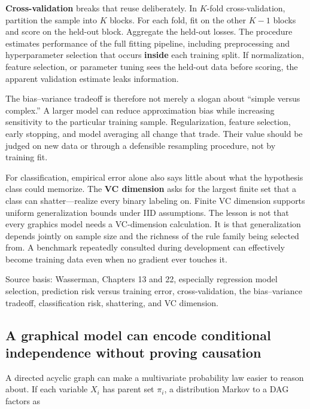 \textbf{Cross-validation} breaks that reuse deliberately. In \(K\)-fold cross-validation, partition the sample into \(K\) blocks. For each fold, fit on the other \(K-1\) blocks and score on the held-out block. Aggregate the held-out losses. The procedure estimates performance of the full fitting pipeline, including preprocessing and hyperparameter selection that occurs \textbf{inside} each training split. If normalization, feature selection, or parameter tuning sees the held-out data before scoring, the apparent validation estimate leaks information.

The bias--variance tradeoff is therefore not merely a slogan about ``simple versus complex.'' A larger model can reduce approximation bias while increasing sensitivity to the particular training sample. Regularization, feature selection, early stopping, and model averaging all change that trade. Their value should be judged on new data or through a defensible resampling procedure, not by training fit.

For classification, empirical error alone also says little about what the hypothesis class could memorize. The \textbf{VC dimension} asks for the largest finite set that a class can shatter---realize every binary labeling on. Finite VC dimension supports uniform generalization bounds under IID assumptions. The lesson is not that every graphics model needs a VC-dimension calculation. It is that generalization depends jointly on sample size and the richness of the rule family being selected from. A benchmark repeatedly consulted during development can effectively become training data even when no gradient ever touches it.

Source basis: Wasserman, Chapters 13 and 22, especially regression model selection, prediction risk versus training error, cross-validation, the bias--variance tradeoff, classification risk, shattering, and VC dimension.

\subsection{A graphical model can encode conditional independence without proving causation}\label{02-foundations-ii-ch030-a-graphical-model-can-encode-conditional-independence-without-proving-causation}

\hypertarget{02-foundations-ii-ch030-a-graphical-model-can-encode-conditional-independence-without-proving-causation}{}

A directed acyclic graph can make a multivariate probability law easier to reason about. If each variable \(X_i\) has parent set \(\pi_i\), a distribution Markov to a DAG factors as

